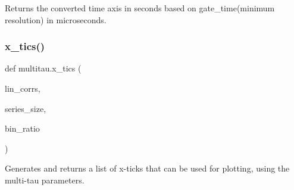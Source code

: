 \begin{DoxyVerb}Returns the converted time axis in seconds based 
on gate_time(minimum resolution) in microseconds.
\end{DoxyVerb}
 \mbox{\label{namespacemultitau_a775aea685fe55a6707400660fadf9c35}} 
\subsubsection{\texorpdfstring{x\+\_\+tics()}{x\_tics()}}
{\footnotesize\ttfamily def multitau.\+x\+\_\+tics (\begin{DoxyParamCaption}\item[{}]{lin\+\_\+corrs,  }\item[{}]{series\+\_\+size,  }\item[{}]{bin\+\_\+ratio }\end{DoxyParamCaption})}

\begin{DoxyVerb}Generates and returns a list of x-ticks that can be used for plotting, using the 
multi-tau parameters.
\end{DoxyVerb}
 